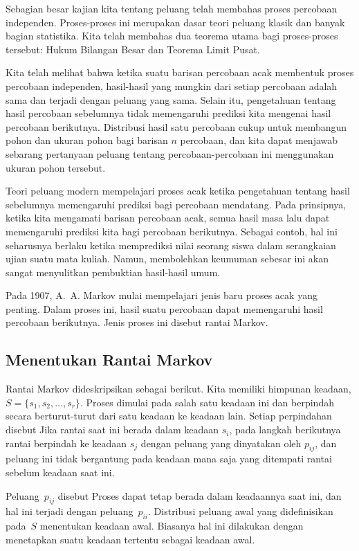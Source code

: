 \par
Sebagian besar kajian kita tentang peluang telah membahas proses percobaan
independen. Proses-proses ini merupakan dasar teori peluang klasik dan banyak
bagian statistika. Kita telah membahas dua teorema utama bagi proses-proses
tersebut: Hukum Bilangan Besar dan Teorema Limit Pusat.
\par
Kita telah melihat bahwa ketika suatu barisan percobaan acak membentuk proses
percobaan independen, hasil-hasil yang mungkin dari setiap percobaan adalah sama
dan terjadi dengan peluang yang sama. Selain itu, pengetahuan tentang hasil
percobaan sebelumnya tidak memengaruhi prediksi kita mengenai hasil percobaan
berikutnya. Distribusi hasil satu percobaan cukup untuk membangun pohon dan
ukuran pohon bagi barisan $n$ percobaan, dan kita dapat menjawab sebarang
pertanyaan peluang tentang percobaan-percobaan ini menggunakan ukuran pohon tersebut.
\par
Teori peluang modern mempelajari proses acak ketika pengetahuan tentang hasil
sebelumnya memengaruhi prediksi bagi percobaan mendatang. Pada prinsipnya, ketika
kita mengamati barisan percobaan acak, semua hasil masa lalu dapat memengaruhi
prediksi kita bagi percobaan berikutnya. Sebagai contoh, hal ini seharusnya
berlaku ketika memprediksi nilai seorang siswa dalam serangkaian ujian suatu
mata kuliah. Namun, membolehkan keumuman sebesar ini akan sangat menyulitkan
pembuktian hasil-hasil umum.
\par
Pada 1907, A.~A. Markov mulai mempelajari jenis baru proses acak yang penting.
Dalam proses ini, hasil suatu percobaan dapat memengaruhi hasil percobaan
berikutnya. Jenis proses ini disebut rantai Markov.
\subsection*{Menentukan Rantai Markov}
Rantai Markov dideskripsikan sebagai berikut. Kita memiliki himpunan \emx
{keadaan,} $S = \{s_1,s_2,\ldots,s_r\}$.
Proses dimulai pada salah satu keadaan ini dan berpindah secara berturut-turut
dari satu keadaan ke keadaan lain. Setiap perpindahan disebut 
Jika rantai saat ini berada dalam keadaan $s_i$, pada langkah berikutnya rantai
berpindah ke keadaan $s_j$ dengan peluang yang dinyatakan oleh $p_{ij}$, dan
peluang ini tidak bergantung pada keadaan mana saja yang ditempati rantai
sebelum keadaan saat ini.
\par
Peluang~$p_{ij}$ disebut 
 Proses dapat tetap berada dalam keadaannya saat ini,
dan hal ini terjadi dengan peluang~$p_{ii}$. Distribusi peluang awal yang
didefinisikan pada~$S$ menentukan keadaan awal. Biasanya hal ini dilakukan
dengan menetapkan suatu keadaan tertentu sebagai keadaan awal.

